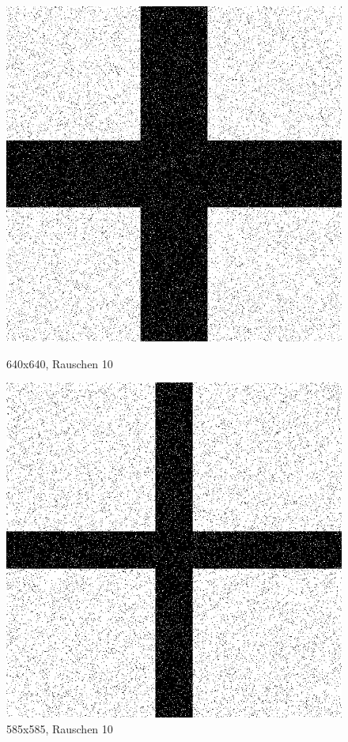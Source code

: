 \begin{figure}[hbt]
	\begin{minipage}{0.5 \textwidth}
		\includegraphics[width=\textwidth]{./Bilder/Auswertung/BeispielBilder/Picture_Crossing_noise_10_pixelCnt_128_featureCnt_5}
		\caption{640x640, Rauschen 10}
	\end{minipage}
	\hfill
	\begin{minipage}{0.5 \textwidth}
		\includegraphics[width=\textwidth]{./Bilder/Auswertung/BeispielBilder/Picture_Crossing_noise_10_pixelCnt_65_featureCnt_9}
		\caption{585x585, Rauschen 10}
	\end{minipage}
\end{figure}


